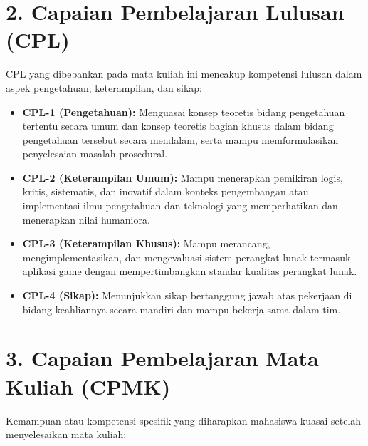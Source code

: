 \documentclass[12pt,a4paper]{article}
\begin{document}
\section*{2. Capaian Pembelajaran Lulusan (CPL)}

CPL yang dibebankan pada mata kuliah ini mencakup kompetensi lulusan dalam aspek pengetahuan, keterampilan, dan sikap:

\begin{itemize}[leftmargin=*]
  \item \textbf{CPL-1 (Pengetahuan):} Menguasai konsep teoretis bidang pengetahuan tertentu secara umum dan konsep teoretis bagian khusus dalam bidang pengetahuan tersebut secara mendalam, serta mampu memformulasikan penyelesaian masalah prosedural.
  
  \item \textbf{CPL-2 (Keterampilan Umum):} Mampu menerapkan pemikiran logis, kritis, sistematis, dan inovatif dalam konteks pengembangan atau implementasi ilmu pengetahuan dan teknologi yang memperhatikan dan menerapkan nilai humaniora.
  
  \item \textbf{CPL-3 (Keterampilan Khusus):} Mampu merancang, mengimplementasikan, dan mengevaluasi sistem perangkat lunak termasuk aplikasi game dengan mempertimbangkan standar kualitas perangkat lunak.
  
  \item \textbf{CPL-4 (Sikap):} Menunjukkan sikap bertanggung jawab atas pekerjaan di bidang keahliannya secara mandiri dan mampu bekerja sama dalam tim.
\end{itemize}

\vspace{0.5cm}

\section*{3. Capaian Pembelajaran Mata Kuliah (CPMK)}

Kemampuan atau kompetensi spesifik yang diharapkan mahasiswa kuasai setelah menyelesaikan mata kuliah:
\end{document}
